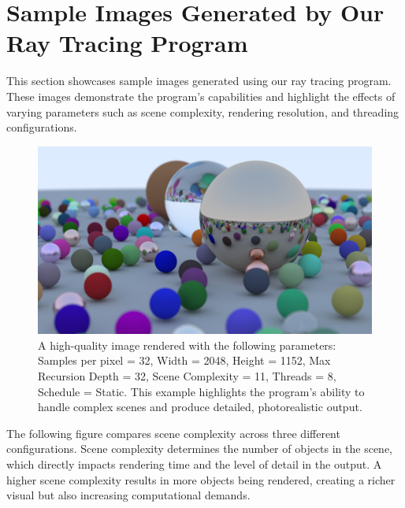 \appendixpage
\section{Sample Images Generated by Our Ray Tracing Program}

This section showcases sample images generated using our ray tracing program. These images demonstrate the program's capabilities and highlight the effects of varying parameters such as scene complexity, rendering resolution, and threading configurations.

\begin{figure}[htbp]
    \centering
    \includegraphics[width=1.0\linewidth]{images/fine-image.jpg}
    \caption{A high-quality image rendered with the following parameters: Samples per pixel = 32, Width = 2048, Height = 1152, Max Recursion Depth = 32, Scene Complexity = 11, Threads = 8, Schedule = Static. This example highlights the program's ability to handle complex scenes and produce detailed, photorealistic output.}
    \label{fig:sample-image-fine}
\end{figure}

The following figure compares scene complexity across three different configurations. Scene complexity determines the number of objects in the scene, which directly impacts rendering time and the level of detail in the output. A higher scene complexity results in more objects being rendered, creating a richer visual but also increasing computational demands.

